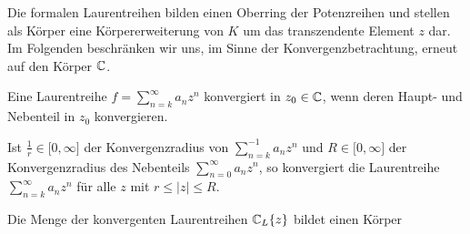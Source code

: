 %
Die formalen Laurentreihen bilden einen Oberring der Potenzreihen und stellen als Körper eine Körpererweiterung von $K$ um das transzendente Element $z$ dar.  %
%
%
%
%
% 
%
%
%
Im Folgenden beschränken wir uns, im Sinne der Konvergenzbetrachtung, erneut auf den Körper $\mathbb{C}$. 
%
\begin{defn}
Eine Laurentreihe $f = \sum_{n=k}^\infty a_n z^n$  konvergiert in $z_0 \in \mathbb{C}$, wenn deren Haupt- und Nebenteil in $z_0$ konvergieren.
\end{defn}
%
%
\begin{bem}
Ist $\frac{1}{r} \in \lbrack 0,\infty\rbrack$ der Konvergenzradius von $\sum_{n=k}^{-1} a_{n}z^n$ und $R\in \lbrack 0,\infty\rbrack$ der Konvergenzradius des Nebenteils $\sum_{n=0}^{\infty} a_{n}z^n$, so konvergiert die Laurentreihe $\sum_{n=k}^\infty a_n z^n$ für alle $z$ mit $r \le |z| \le R$.
\end{bem} %
%
%
%
%
%
\begin{satz}
Die Menge der konvergenten Laurentreihen $\mathbb{C}_L\lbrace z\rbrace$ bildet einen Körper
\end{satz}
